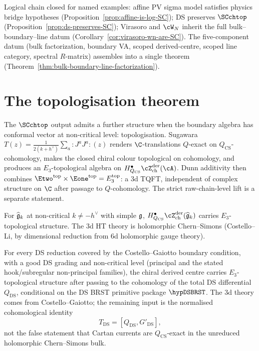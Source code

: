 Logical chain closed for named examples: affine PV sigma model
satisfies physics bridge hypotheses
(Proposition~\ref{prop:affine-is-log-SC}); DS preserves
$\SCchtop$ (Proposition~\ref{prop:ds-preserves-SC}); Virasoro
and $\cW_N$ inherit the full bulk--boundary--line datum
(Corollary~\ref{cor:virasoro-wn-are-SC}). The five-component
datum (bulk factorization, boundary VA, scoped derived-centre,
scoped line category, spectral $R$-matrix) assembles into a
single theorem
(Theorem~\ref{thm:bulk-boundary-line-factorization}).

\section*{The topologisation theorem}

The $\SCchtop$ output admits a further structure when the
boundary algebra has conformal vector at non-critical level:
topologisation. Sugawara
$T(z) = \frac{1}{2(k+h^\vee)}\sum_a {:}J^a J^a{:}(z)$ renders
$\C$-translations $Q$-exact on \(Q_{\mathrm{CS}}\)-cohomology, makes the closed
chiral colour topological on cohomology, and produces an
$E_3$-topological algebra on
$H^\bullet_{Q_{\mathrm{CS}}}\cZ^{\mathrm{der}}_{\mathrm{ch}}(\cA)$. Dunn additivity then combines
$\Etwo^{\mathrm{top}} \times \Eone^{\mathrm{top}} =
E_3^{\mathrm{top}}$: a 3d TQFT, independent of complex structure
on $\C$ after passage to \(Q\)-cohomology. The strict raw-chain-level
lift is a separate statement.

\begin{maintheorem}
\label{thm:intro-e3-km}
For $\widehat{\mathfrak{g}}_k$ at non-critical $k \neq -h^\vee$ with
simple $\mathfrak{g}$,
$H^\bullet_{Q_{\mathrm{CS}}}\cZ^{\mathrm{der}}_{\mathrm{ch}}(\widehat{\fg}_k)$
carries $E_3$-topological structure. The 3d HT theory is
holomorphic Chern--Simons (Costello--Li, by dimensional
reduction from 6d holomorphic gauge theory).
\end{maintheorem}

\begin{maintheorem}
\label{thm:intro-e3-ds}
For every DS reduction covered by the Costello--Gaiotto boundary
condition, with a good DS grading and non-critical level
(principal and the stated hook/subregular non-principal families),
the chiral derived centre carries $E_3$-topological structure after
passing to the cohomology of the total DS differential
\(Q_{\mathrm{DS}}\), conditional on the DS BRST primitive package
\(\hypDSBRST\).  The 3d theory comes from Costello--Gaiotto; the
remaining input is the normalised cohomological identity
\[
T_{\mathrm{DS}}=[Q_{\mathrm{DS}},G'_{\mathrm{DS}}],
\]
not the false statement that Cartan currents are
\(Q_{\mathrm{CS}}\)-exact in the unreduced holomorphic
Chern--Simons bulk.
\end{maintheorem}


